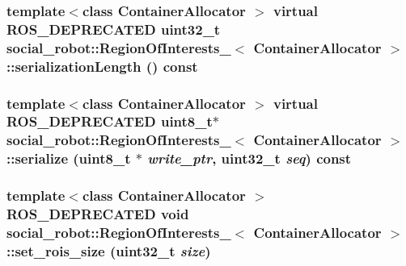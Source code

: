 \label{structsocial__robot_1_1RegionOfInterests___ae0221ee438ffcc558e4629b51230b6c2}
\hypertarget{structsocial__robot_1_1RegionOfInterests___ad2c2cdef56b5c47648c81feba25b8cae}{
\subsubsection[{serializationLength}]{\setlength{\rightskip}{0pt plus 5cm}template$<$class ContainerAllocator $>$ virtual ROS\_\-DEPRECATED uint32\_\-t {\bf social\_\-robot::RegionOfInterests\_\-}$<$ ContainerAllocator $>$::serializationLength () const}}
\label{structsocial__robot_1_1RegionOfInterests___ad2c2cdef56b5c47648c81feba25b8cae}
\hypertarget{structsocial__robot_1_1RegionOfInterests___a97418470f8dd424d30a3b441d3202341}{
\subsubsection[{serialize}]{\setlength{\rightskip}{0pt plus 5cm}template$<$class ContainerAllocator $>$ virtual ROS\_\-DEPRECATED uint8\_\-t$\ast$ {\bf social\_\-robot::RegionOfInterests\_\-}$<$ ContainerAllocator $>$::serialize (uint8\_\-t $\ast$ {\em write\_\-ptr}, \/  uint32\_\-t {\em seq}) const}}
\label{structsocial__robot_1_1RegionOfInterests___a97418470f8dd424d30a3b441d3202341}
\hypertarget{structsocial__robot_1_1RegionOfInterests___a23f551dd5898a5fabd6af746ba4a658a}{
\subsubsection[{set\_\-rois\_\-size}]{\setlength{\rightskip}{0pt plus 5cm}template$<$class ContainerAllocator $>$ ROS\_\-DEPRECATED void {\bf social\_\-robot::RegionOfInterests\_\-}$<$ ContainerAllocator $>$::set\_\-rois\_\-size (uint32\_\-t {\em size})}}
